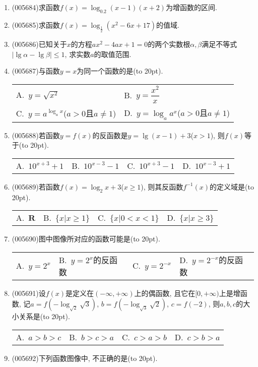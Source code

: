\documentclass[10pt,a4paper]{article}
\newcommand{\bracket}[1]{(\hbox to #1pt{})}
\newcommand{\twoch}[4]{\par\begin{tabular}{p{.46\textwidth}p{.46\textwidth}}
A.~#1& B.~#2\\
C.~#3& D.~#4
\end{tabular}}
\newcommand{\fourch}[4]{\par\begin{tabular}{p{.23\textwidth}p{.23\textwidth}p{.23\textwidth}p{.23\textwidth}}
A.~#1 &B.~#2& C.~#3& D.~#4
\end{tabular}}
\begin{document}
\begin{enumerate}[1.]
\item {\tiny (005684)}求函数$f(x)=\log_{0.2}(x-1)(x+2)$为增函数的区间.
\item {\tiny (005685)}求函数$f(x)=\log_{\frac 12}(x^2-6x+17)$的值域.
\item {\tiny (005686)}已知关于$x$的方程$ax^2-4ax+1=0$的两个实数根$\alpha ,\beta$满足不等式$|\lg \alpha -\lg \beta|\le 1$, 求实数$a$的取值范围.
\item {\tiny (005687)}与函数$y=x$为同一个函数的是\bracket{20}.
\twoch{$y=\sqrt {x^2}$}{$y=\dfrac{x^2}x$}{$y=a^{\log_ax}$($a>0$且$a\ne 1$)}{$y=\log_aa^x$($a>0$且$a\ne 1$)}
\item {\tiny (005688)}若函数$y=f(x)$的反函数是$y=\lg (x-1)+3$($x>1$), 则$f(x)$等于\bracket{20}.
\fourch{$10^{x+3}+1$}{$10^{x-3}-1$}{$10^{x+3}-1$}{$10^{x-3}+1$}
\item {\tiny (005689)}若函数$f(x)=\log_2x+3$($x\ge 1$), 则其反函数$f^{-1}(x)$的定义域是\bracket{20}.
\fourch{$\mathbf{R}$}{$\{x|x\ge 1\}$}{$\{x|0<x<1\}$}{$\{x|x\ge 3\}$}
\item {\tiny (005690)}图中图像所对应的函数可能是\bracket{20}.
\begin{center}
\end{center}
\fourch{$y=2^x$}{$y=2^x$的反函数}{$y=2^{-x}$}{$y=2^{-x}$的反函数}
\item {\tiny (005691)}设$f(x)$是定义在$(-\infty ,+\infty)$上的偶函数, 且它在$[0,+\infty)$上是增函数, 记$a=f(-\log_{\sqrt 2}\sqrt 3)$, $b=f(-\log_{\sqrt 3}\sqrt 2)$, $c=f(-2)$, 则$a,b,c$的大小关系是\bracket{20}.
\fourch{$a>b>c$}{$b>c>a$}{$c>a>b$}{$c>b>a$}
\item {\tiny (005692)}下列函数图像中, 不正确的是\bracket{20}.
\begin{center}

\end{center}
\end{enumerate}
\end{document}
